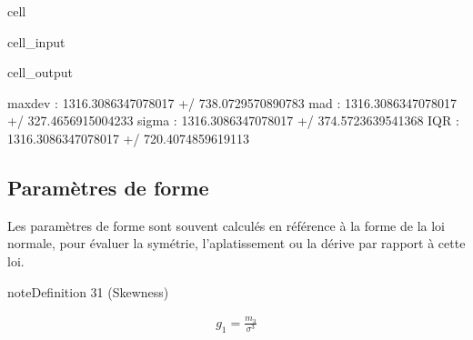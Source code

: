 \documentclass[letterpaper,10pt,english]{jupyterBook}
\begin{document}
\begin{sphinxuseclass}{cell}
\begin{sphinxVerbatimInput}
\begin{sphinxuseclass}{cell_input}
\begin{sphinxVerbatim}[commandchars=\\\{\}]
    \PYG{p}{[}\PYG{p}{]}\PYG{p}{[}\PYG{p}{]}
\end{sphinxVerbatim}

\end{sphinxuseclass}\end{sphinxVerbatimInput}
\begin{sphinxVerbatimOutput}

\begin{sphinxuseclass}{cell_output}
\begin{sphinxVerbatim}[commandchars=\\\{\}]
max\PYGZus{}dev  :  1316.3086347078017 +/\PYGZhy{} 738.0729570890783
mad  :  1316.3086347078017 +/\PYGZhy{} 327.4656915004233
sigma  :  1316.3086347078017 +/\PYGZhy{} 374.5723639541368
IQR  :  1316.3086347078017 +/\PYGZhy{} 720.4074859619113
\end{sphinxVerbatim}

\noindent{}

\end{sphinxuseclass}\end{sphinxVerbatimOutput}

\end{sphinxuseclass}

\subsection{Paramètres de forme}
\label{\detokenize{statsdescriptives:parametres-de-forme}}
\sphinxAtStartPar
Les paramètres de forme sont souvent calculés en référence à la forme de la loi normale, pour évaluer la symétrie, l’aplatissement ou la dérive par rapport à cette loi.
\label{statsdescriptives:definition-15}
\begin{sphinxadmonition}{note}{Definition 31 (Skewness)}


\begin{equation*}
\begin{split}g_1 = \frac{m_3}{\sigma^3}\end{split}
\end{equation*}\end{sphinxadmonition}
\end{document}
